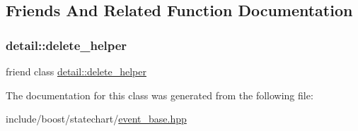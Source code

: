 \subsection{Friends And Related Function Documentation}
\mbox{\label{classboost_1_1statechart_1_1event__base_a31bef395a8bdf9cce657750be1b04f49}} 
\subsubsection{\texorpdfstring{detail\+::delete\+\_\+helper}{detail::delete\_helper}}
{\footnotesize\ttfamily friend class \mbox{\hyperlink{classboost_1_1statechart_1_1detail_1_1delete__helper}{detail\+::delete\+\_\+helper}}\hspace{0.3cm}{\ttfamily [friend]}}



The documentation for this class was generated from the following file\+:\begin{DoxyCompactItemize}
\item 
include/boost/statechart/\mbox{\hyperlink{event__base_8hpp}{event\+\_\+base.\+hpp}}\end{DoxyCompactItemize}
